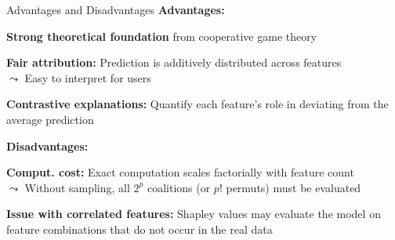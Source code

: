 \documentclass[10pt,compress,t,notes=noshow, xcolor=table]{beamer}
\begin{document}

\begin{framev}[align=top]{Advantages and Disadvantages}
\textbf{Advantages:}
\begin{itemizeM}%
\item \textbf{Strong theoretical foundation} from cooperative game theory
\item \textbf{Fair attribution:} Prediction is additively distributed across features\\
$\leadsto$ Easy to interpret for users
\item \textbf{Contrastive explanations:} Quantify each feature's role in deviating from the average prediction
\end{itemizeM}
\spacer[0.25]
\textbf{Disadvantages:}
\begin{itemizeM}%
\item \textbf{Comput. cost:} Exact computation scales factorially with feature count\\
$\leadsto$ Without sampling, all $2^p$ coalitions (or $p!$ permuts) must be evaluated
\item \textbf{Issue with correlated features:} Shapley values may evaluate the model on feature combinations that do not occur in the real data
\end{itemizeM}
\end{framev}


\endlecture
\end{document}
